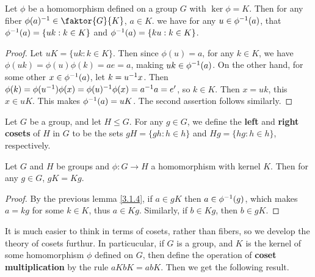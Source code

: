 \begin{lemma}\label{lemma_3.1.4}
  Let $\phi$ be a homomorphism defined on a group  $G$ with  $\ker{\phi}=K$.
  Then for any fiber $\inv{\phi(a)} \in \faktor{G}{K}$, $a \in K$. we have
  for any $u \in \phi^{-1}(a)$, that $\phi^{-1}(a)=\{uk : k \in K\}$ and
  $\phi^{-1}(a)=\{ku : k \in K\}$.
\end{lemma}
\begin{proof}
  Let $uK=\{uk : k \in K\}$. Then since $\phi(u)=a$, for any $k \in K$, we
  have  $\phi(uk)=\phi(u)\phi(k)=ae=a$, making $uk \in \phi^{-1}(a)$. On the
  other hand, for some other $x \in \phi^{-1}(a)$, let $k=u^{-1}x$. Then
  $\phi(k)=\phi(u^{-1})\phi(x)=\phi(u)^{-1}\phi(x)=a^{-1}a=e'$, so $k \in
  K$. Then  $x=uk$, this  $x \in uK$. This makes  $\phi^{-1}(a)=uK$. The
  second assertion follows similarly.
\end{proof}

\begin{definition}
  Let $G$ be a group, and let  $H \leq G$. For any  $g \in G$, we define the
  \textbf{left} and \textbf{right cosets} of $H$ in $G$ to be the sets
  $gH=\{gh : h \in h\}$ and $Hg=\{hg : h \in h\}$, respectively.
\end{definition}

\begin{lemma}\label{lemma_3.1.5}
  Let $G$ and  $H$ be groups and  $\phi:G \rightarrow H$ a homomorphism with
  kernel $K$. Then for any  $g \in G$,  $gK=Kg$.
\end{lemma}
\begin{proof}
  By the previous lemma \ref{3.1.4}, if $a \in gK$ then  $a \in \phi^{-1}(g)$,
  which makes $a=kg$ for some  $k \in K$, thus  $a \in Kg$. Similarly, if  $b
  \in Kg$, then  $b \in gK$.
\end{proof}

It is much easier to think in terms of cosets, rather than fibers, so we develop
the theory of cosets furthur. In particucular, if $G$ is a group, and  $K$ is
the kernel of some homomorphism  $\phi$ defined on  $G$, then define the
operation of  \textbf{coset multiplication} by the rule $aKbK=abK$. Then we get
the following result.

